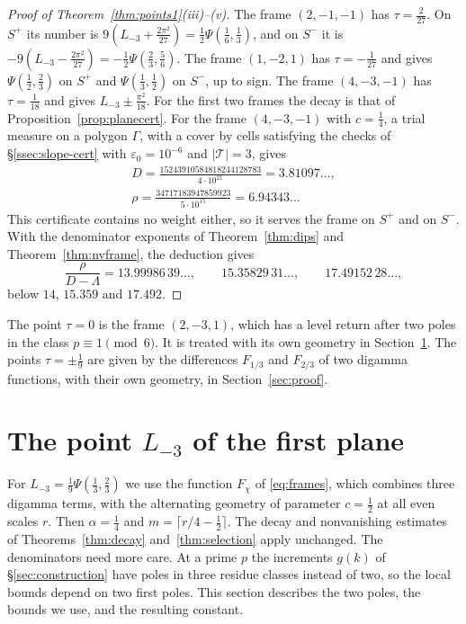 \documentclass[11pt]{amsart}
\theoremstyle{definition}
\theoremstyle{remark}
\numberwithin{equation}{section}
\newcommand{\Lt}{L_{-3}}             %
\newcommand{\MuDipA}{14}
\newcommand{\MuDipB}{15.359}
\newcommand{\MuDipC}{17.492}
\begin{document}
\begin{proof}[Proof of Theorem~\ref{thm:points1}(iii)--(v)]
The frame $(2,-1,-1)$ has $\tau=\frac2{27}$. On $S^+$ its number is $9(\Lt+\frac{2\pi^2}{27})=\frac12\Psi(\frac16,\frac13)$,
and on $S^-$ it is $-9(\Lt-\frac{2\pi^2}{27})=-\frac12\Psi(\frac23,\frac56)$. The frame $(1,-2,1)$ has $\tau=-\frac1{27}$
and gives $\Psi(\frac12,\frac23)$ on $S^+$ and $\Psi(\frac13,\frac12)$ on $S^-$, up to sign. The frame $(4,-3,-1)$ has
$\tau=\frac1{18}$ and gives $\Lt\pm\frac{\pi^2}{18}$. For the first two frames the decay is that of
Proposition~\ref{prop:planecert}. For the frame $(4,-3,-1)$ with $c=\frac14$, a trial measure on a polygon $\Gamma$, with
a cover by cells satisfying the checks of \S\ref{ssec:slope-cert} with $\varepsilon_0=10^{-6}$ and $|\mathcal T|=3$, gives
\begin{gather*}
 D=\frac{15243910584818244128783}{4\cdot10^{21}}=3.81097\ldots,\\
 \rho=\frac{34717183947859923}{5\cdot10^{15}}=6.94343\ldots
\end{gather*}
This certificate contains no weight either, so it serves the frame on $S^+$ and on $S^-$. With the denominator
exponents of Theorem~\ref{thm:dips} and Theorem~\ref{thm:nvframe}, the deduction gives
\[
 \frac\rho{D-\Lambda}=13.99986\,39\ldots,\qquad 15.35829\,31\ldots,\qquad 17.49152\,28\ldots,
\]
below $\MuDipA$, $\MuDipB$ and $\MuDipC$.
\end{proof}

The point $\tau=0$ is the frame $(2,-3,1)$, which has a level return after two poles in the class $p\equiv1\pmod6$. It is
treated with its own geometry in Section~\ref{sec:chi3-quarter}. The points $\tau=\pm\frac19$ are given by the
differences $F_{1/3}$ and $F_{2/3}$ of two digamma functions, with their own geometry, in Section~\ref{sec:proof}.

\section{The point \texorpdfstring{$\Lt$}{L(2,chi-3)} of the first plane}
\label{sec:chi3-quarter}

For $\Lt=\frac19\Psi(\frac13,\frac23)$ we use the function $F_\chi$ of \eqref{eq:frames}, which combines three digamma terms, with
the alternating geometry of parameter $c=\frac12$ at all even scales $r$. Then $\alpha=\frac14$ and
$m=\lceil r/4-\frac12\rceil$. The decay and nonvanishing estimates of Theorems~\ref{thm:decay} and~\ref{thm:selection}
apply unchanged. The denominators need more care. At a prime $p$ the increments $g(k)$ of \S\ref{sec:construction} have
poles in three residue classes instead of two, so the local bounds depend on two first poles. This section describes the
two poles, the bounds we use, and the resulting constant.
\end{document}

